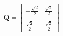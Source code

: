 \documentclass[preview]{standalone}
\begin{document}
\begin{align*}
\mathbf{Q} = \begin{bmatrix}-\frac{\sqrt{2}}{2} & \frac{\sqrt{2}}{2} \\ \\\frac{\sqrt{2}}{2} & \frac{\sqrt{2}}{2}\end{bmatrix}
\end{align*}
\end{document}

